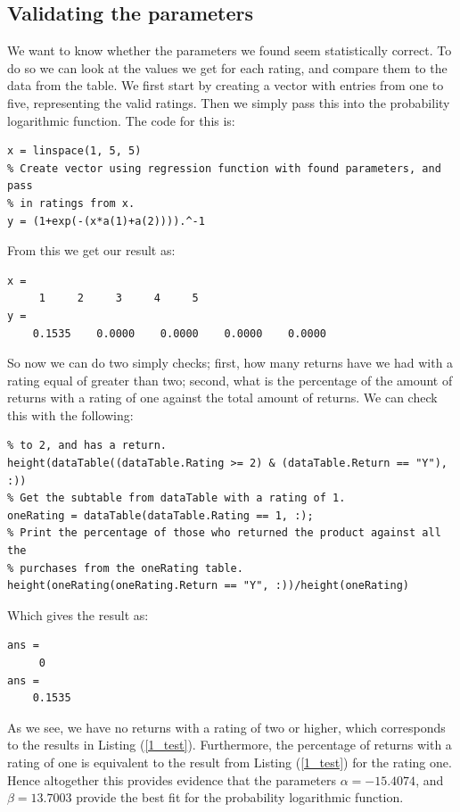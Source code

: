 \documentclass[12pt]{article}
\let\oldref\ref
\renewcommand{\ref}[1]{(\oldref{#1})}
\begin{document}
\subsection{Validating the parameters}
We want to know whether the parameters we found seem statistically correct. To do so we can look at the values we get for each rating, and compare them to the data from the table. We first start by creating a vector with entries from one to five, representing the valid ratings. Then we simply pass this into the probability logarithmic function. The code for this is:
\begin{lstlisting}[title={Checking the parameters}]
% Create vector of 1 to 5 integers.
x = linspace(1, 5, 5)
% Create vector using regression function with found parameters, and pass
% in ratings from x.
y = (1+exp(-(x*a(1)+a(2)))).^-1
\end{lstlisting}
From this we get our result as:
\begin{lstlisting}[caption={Checking the parameters}, label={1_test}]
x =
     1     2     3     4     5
y =
    0.1535    0.0000    0.0000    0.0000    0.0000
\end{lstlisting}
So now we can do two simply checks; first, how many returns have we had with a rating equal of greater than two; second, what is the percentage of the amount of returns with a rating of one against the total amount of returns. We can check this with the following:
\begin{lstlisting}[title={Checking the parameters}]
% Print the number of rows where the Rating column is greater than or equal
% to 2, and has a return.
height(dataTable((dataTable.Rating >= 2) & (dataTable.Return == "Y"), :))
% Get the subtable from dataTable with a rating of 1.
oneRating = dataTable(dataTable.Rating == 1, :);
% Print the percentage of those who returned the product against all the
% purchases from the oneRating table.
height(oneRating(oneRating.Return == "Y", :))/height(oneRating)
\end{lstlisting}
Which gives the result as:
\begin{lstlisting}[title={Result from checking the parameters}]
ans =
     0
ans =
    0.1535
\end{lstlisting}
As we see, we have no returns with a rating of two or higher, which corresponds to the results in Listing  \ref{1_test}. Furthermore, the percentage of returns with a rating of one is equivalent to the result from Listing  \ref{1_test} for the rating one. Hence altogether this provides evidence that the parameters $\alpha=-15.4074$, and $\beta=13.7003$ provide the best fit for the probability logarithmic function.
\end{document}
